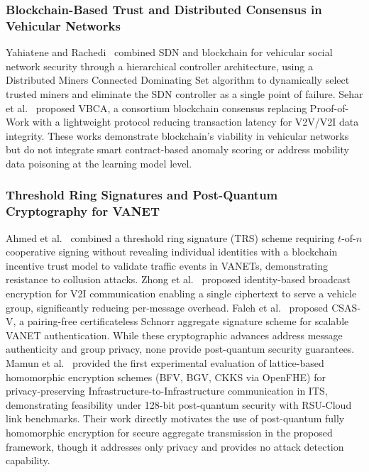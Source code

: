 \documentclass[12pt, a4paper]{report}
\begin{document}
\subsubsection{Blockchain-Based Trust and Distributed Consensus in Vehicular Networks}
Yahiatene and Rachedi~\cite{yahiatene2018towards} combined SDN and
blockchain for vehicular social network security through a hierarchical
controller architecture, using a Distributed Miners Connected Dominating Set
algorithm to dynamically select trusted miners and eliminate the SDN
controller as a single point of failure. Sehar et al.~\cite{sehar2023blockchain}
proposed VBCA, a consortium blockchain consensus replacing Proof-of-Work with
a lightweight protocol reducing transaction latency for V2V/V2I data integrity.
These works demonstrate blockchain's viability in vehicular networks but do
not integrate smart contract-based anomaly scoring or address mobility
data poisoning at the learning model level.

\subsubsection{Threshold Ring Signatures and Post-Quantum Cryptography for VANET}
Ahmed et al.~\cite{ahmed2022blockchain} combined a threshold ring signature
(TRS) scheme requiring $t$-of-$n$ cooperative signing without revealing
individual identities with a blockchain incentive trust model to validate
traffic events in VANETs, demonstrating resistance to collusion attacks.
Zhong et al.~\cite{zhong2022broadcast} proposed identity-based broadcast
encryption for V2I communication enabling a single ciphertext to serve a
vehicle group, significantly reducing per-message overhead. Faleh et
al.~\cite{faleh2025csasv} proposed CSAS-V, a pairing-free certificateless
Schnorr aggregate signature scheme for scalable VANET authentication. While
these cryptographic advances address message authenticity and group privacy,
none provide post-quantum security guarantees. Mamun et al.~\cite{mamun2025postquantum}
provided the first experimental evaluation of lattice-based homomorphic
encryption schemes (BFV, BGV, CKKS via OpenFHE) for privacy-preserving
Infrastructure-to-Infrastructure communication in ITS, demonstrating
feasibility under 128-bit post-quantum security with RSU-Cloud link
benchmarks. Their work directly motivates the use of post-quantum fully
homomorphic encryption for secure aggregate transmission in the proposed
framework, though it addresses only privacy and provides no attack detection
capability.
\end{document}
